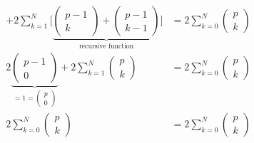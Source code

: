 \begin{align}
    +
    2 \sum_{k=1}^{N}
    \Big \lbrack \underbrace{
    \left(
    \begin{array}{c}
	p-1\\ k
	\end{array}\right)
    +\left(
    \begin{array}{c} 
	p-1\\ k-1
	\end{array}\right)
    }_{\text{recursive function}}
    \Big 
    \rbrack
    &= 2 \sum_{k=0}^{N}
    \left(
    \begin{array}{c} 
	p\\ k
	\end{array}\right)\\
    2 \underbrace{\left( \begin{array}{c}
	p-1\\ 0
	\end{array}\right)}_{=1=\left( \begin{array}{c}
	p\\ 0
	\end{array}\right)}
    +
    2 \sum_{k=1}^{N}\left( \begin{array}{c}
	p\\ k
	\end{array}\right)
    &= 2 \sum_{k=0}^{N}
    \left( \begin{array}{c}
	p\\ k
	\end{array}\right)\\
2 \sum_{k=0}^{N}
    \left( \begin{array}{c}
	p\\ k
	\end{array}\right)
    &=
2 \sum_{k=0}^{N}
    \left( \begin{array}{c}
	p\\ k
	\end{array}\right)
\end{align}
